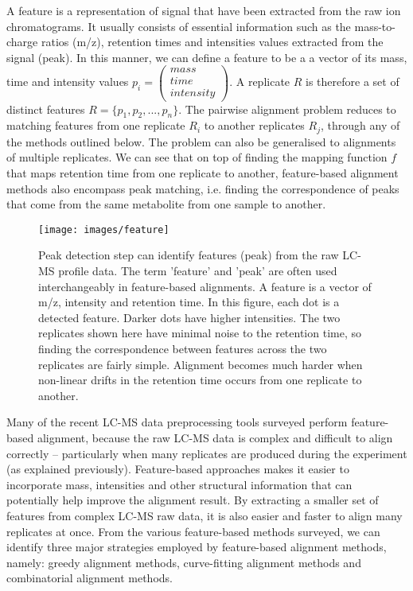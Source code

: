A feature is a representation of signal that have been extracted from the raw ion chromatograms. It usually consists of essential information such as the mass-to-charge ratios (m/z), retention times and intensities values extracted from the signal (peak). In this manner, we can define a feature to be a a vector of its mass, time and intensity values
$p_{i}=\left(\begin{array}{c}
mass\\
time\\
intensity
\end{array}\right)$. A replicate $R$ is therefore a set of distinct features $R=\{p_{1},p_{2},...,p_{n}\}$. The pairwise alignment problem reduces to matching features from one replicate $R_{i}$ to another replicates $R_{j}$, through any of the methods outlined below. The problem can also be generalised to alignments of multiple replicates. We can see that on top of finding the mapping function $f$ that maps retention time from one replicate to another, feature-based alignment methods also encompass peak matching, i.e. finding the correspondence of peaks that come from the same metabolite from one sample to another.

\begin{figure}[h]
\noindent \begin{centering}
\texttt{[image: images/feature]}
\par\end{centering}
\caption{\emph{\label{fig:feature-based}}Peak detection step can identify features (peak) from the raw LC-MS profile data. The term 'feature' and 'peak' are often used interchangeably in feature-based alignments. A feature is a vector of m/z, intensity and retention time. In this figure, each dot is a detected feature. Darker dots have higher intensities. The two replicates shown here have minimal noise to the retention time, so finding the correspondence between features across the two replicates are fairly simple. Alignment becomes much harder when non-linear drifts in the retention time occurs from one replicate to another.}
\end{figure}

Many of the recent LC-MS data preprocessing tools surveyed perform feature-based alignment, because the raw LC-MS data is complex and difficult to align correctly -- particularly when many replicates are produced during the experiment (as explained previously). Feature-based approaches makes it easier to incorporate mass, intensities and other structural information that can potentially help improve the alignment result. By extracting a smaller set of features from complex LC-MS raw data, it is also easier and faster to align many replicates at once. From the various feature-based methods surveyed, we can identify three major strategies employed by feature-based alignment methods, namely: greedy alignment methods, curve-fitting alignment methods and combinatorial alignment methods.

